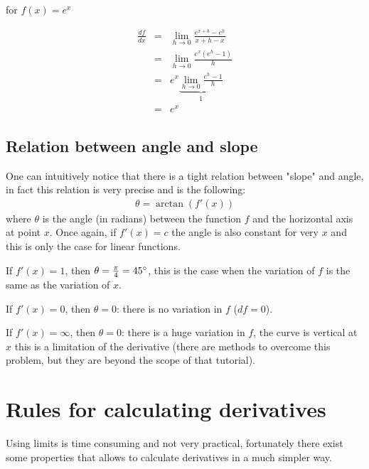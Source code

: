 \documentclass[a4paper] {scrartcl}%
\begin{document}
for $f(x)=e^{x}$

\begin{eqnarray*}
	\frac{df}{dx}
	&=&\lim_{h\rightarrow0}\frac{e^{x+h}-e^{h}}{x+h-x}\\
	&=&\lim_{h\rightarrow0}\frac{e^x(e^h-1)}{h}\\
	&=&e^x\underbrace{\lim_{h\rightarrow0}\frac{e^h-1}{h}}_{1}\\
	&=&e^x
\end{eqnarray*}

\subsection{Relation between angle and slope}
One can intuitively notice that there is a tight relation between "slope" and angle, in fact this relation is very precise and is the following:
\begin{eqnarray}
	\theta = \arctan{(f'(x))}
\end{eqnarray}
where $\theta$ is the angle (in radians) between the function $f$ and the horizontal axis at point $x$. Once again, if $f'(x)=c$ the angle is also constant for very $x$ and this is only the case for linear functions. 

If $f'(x)=1$, then $\theta=\frac{\pi}{4}=45\degree$, this is the case when the variation of $f$ is the same as the variation of $x$.

If $f'(x)=0$, then $\theta=0$: there is no variation in $f$ ($df=0$).

If $f'(x)=\infty$, then $\theta=0$: there is a huge variation in $f$, the curve is vertical at $x$ this is a limitation of the derivative (there are methods to overcome this problem, but they are beyond the scope of that tutorial).


\section{Rules for calculating derivatives}
Using limits is time consuming and not very practical, fortunately there exist some properties that allows to calculate derivatives in a much simpler way.
\end{document}
